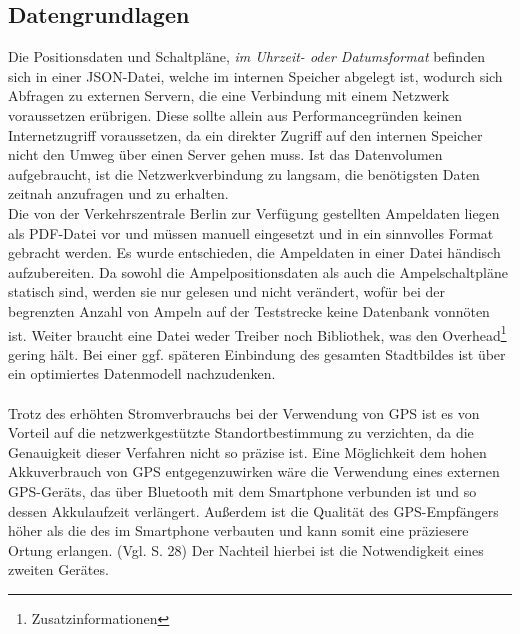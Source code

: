 \subsection{Datengrundlagen}
Die Positionsdaten und Schaltpläne, \textit{im Uhrzeit- oder Datumsformat} befinden sich in einer \gls{JSON}-Datei, welche im internen Speicher abgelegt ist, wodurch sich Abfragen zu externen Servern, die eine Verbindung mit einem Netzwerk voraussetzen erübrigen. Diese sollte allein aus Performancegründen keinen Internetzugriff voraussetzen, da ein direkter Zugriff auf den internen Speicher nicht den Umweg über einen Server gehen muss. Ist das Datenvolumen aufgebraucht, ist die Netzwerkverbindung zu langsam, die benötigsten Daten zeitnah anzufragen und zu erhalten.\\
Die von der Verkehrszentrale Berlin zur Verfügung gestellten Ampeldaten liegen als \gls{PDF}-Datei vor und müssen manuell eingesetzt und in ein sinnvolles Format gebracht werden. Es wurde entschieden, die Ampeldaten in einer Datei händisch aufzubereiten. Da sowohl die Ampelpositionsdaten als auch die Ampelschaltpläne statisch sind, werden sie nur gelesen und nicht verändert, wofür bei der begrenzten Anzahl von Ampeln auf der Teststrecke keine Datenbank vonnöten ist. Weiter braucht eine Datei weder Treiber noch Bibliothek, was den Overhead\footnote{ Zusatzinformationen} gering hält. 
Bei einer ggf. späteren Einbindung des gesamten Stadtbildes ist über ein optimiertes Datenmodell nachzudenken. \\\\
Trotz des erhöhten Stromverbrauchs bei der Verwendung von \gls{GPS} ist es von Vorteil auf die netzwerkgestützte Standortbestimmung zu verzichten, da die Genauigkeit dieser Verfahren nicht so präzise ist. 
Eine Möglichkeit dem hohen Akkuverbrauch von \gls{GPS} entgegenzuwirken wäre die Verwendung eines externen \gls{GPS}-Geräts, das über Bluetooth mit dem \gls{Smartphone} verbunden ist und so dessen Akkulaufzeit verlängert. Außerdem ist die Qualität des \gls{GPS}-Empfängers höher als die des im \gls{Smartphone} verbauten und kann somit eine präziesere Ortung erlangen. (Vgl. \cite{gps} S. 28) Der Nachteil hierbei ist die Notwendigkeit eines zweiten Gerätes.
